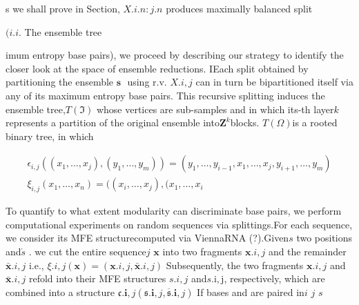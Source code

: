\documentclass{article}
\begin{document}
s we shall prove in Section, $X . { i . { n } : j . { n } }$ produces maximally balanced split


$( i. i.$ The ensemble tree


imum entropy base pairs), we proceed by describing our strategy to identify the
closer look at the space of ensemble reductions. IEach split obtained by partitioning the ensemble${ \textbf { s } }$ using r.v. $X . { i, j }$ can in turn be bipartitioned itself via
any of its maximum entropy base pairs. This recursive splitting induces the
ensemble tree,$T ( \mathfrak { I } )$ whose vertices are sub-samples and in which its-th layer$k$
represents a partition of the original ensemble into$\mathbf { Z } ^ { k }$blocks. $T ( \Omega )$is a rooted
binary tree, in which


\begin{equation}
\begin{array} { c } { \epsilon _ { i, j } ( ( x _ { 1 }, \dots, x _ { j } ), ( y _ { 1 }, \dots, y _ { m } ) ) = ( y _ { 1 }, \dots, y _ { i - 1 }, x _ { 1 }, \dots, x _ { j }, y _ { i + 1 }, \dots, y _ { m } ) } \\ { \xi _ { i, j } ( x _ { 1 }, \dots, x _ { n } ) = ( ( x _ { i }, \dots, x _ { j } ), ( x _ { 1 }, \dots, x _ { i}}\end{array}
\end{equation}


To quantify to what extent modularity can discriminate base pairs, we perform
computational experiments on random sequences via splittings.For each sequence, we consider its MFE structurecomputed via ViennaRNA (?).Given$s$
two positions and$\acute { s }$ . we cut the entire sequence$j$ $\mathbf { x }$ into two fragments $\mathbf { x } . { i, j }$ and
the remainder $\bar { \mathbf { x } } . { i, j }$ i.e., $\xi . { i, j } ( \mathbf { x } ) = ( \mathbf { x } . { i, j }, \bar { \mathbf { x } } . { i, j } )$ Subsequently, the two fragments
$\mathbf { x } . { i, j }$ and $\bar { \mathbf { x } } . { i, j }$ refold into their MFE structures $s . { i, j }$ and$s . { \mathrm { i, j } }$, respectively, which
are combined into a structure $\mathfrak { c } . { \mathbf { i }, j } ( \mathfrak { s } . { \mathbf { i }, j }, \overline { \mathfrak { s } } . { \mathbf { i }, j } )$ If bases and are paired in$i$ $j$ $s$
\end{document}
